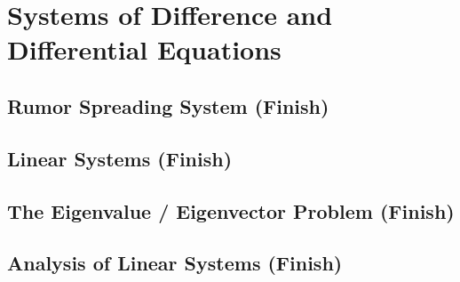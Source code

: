 \chapter{Systems of Difference and Differential Equations}

\section{Rumor Spreading System (Finish)}

\section{Linear Systems (Finish)}

\section{The Eigenvalue / Eigenvector Problem (Finish)}

\section{Analysis of Linear Systems (Finish)}

